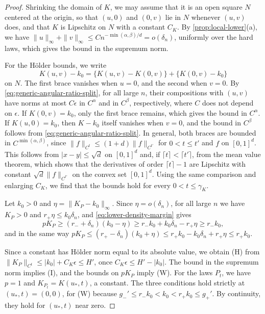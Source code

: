 \begin{proof}
Shrinking the domain of $K$, we may assume that it is an open square $N$
centered at the origin, so that $(u,0)$ and $(0,v)$ lie in $N$ whenever
$(u,v)$ does, and that $K$ is Lipschitz on $N$ with a constant $C_K$.
By \cref{prop:local-lower}(a), we have
$\|u\|_\infty+\|v\|_\infty\le Cn^{-\min(\alpha,\beta)/d}=o(\delta_n)$,
uniformly over the hard laws, which gives the bound in the supremum
norm.

For the H\"older bounds, we write
\[
 K(u,v)-k_0=\{K(u,v)-K(0,v)\}+\{K(0,v)-k_0\}
\]
on $N$. The first brace vanishes when $u=0$, and the second when $v=0$.
By \eqref{eq:generic-angular-ratio-split}, for all large $n$, their
compositions with $(u,v)$ have norms at most $C\epsilon$ in $C^\alpha$
and in $C^\beta$, respectively, where $C$ does not depend on $\epsilon$.
If $K(0,v)=k_0$, only the first brace remains, which gives the bound in
$C^\alpha$. If $K(u,0)=k_0$, then $K-k_0$ itself vanishes when $v=0$,
and the bound in $C^\beta$ follows from
\eqref{eq:generic-angular-ratio-split}.
In general, both braces are bounded in $C^{\min(\alpha,\beta)}$, since
$\|f\|_{C^t}\le(1+d)\|f\|_{C^{t'}}$ for $0<t\le t'$ and $f$ on
$[0,1]^d$. This follows from $|x-y|\le\sqrt d$ on $[0,1]^d$ and, if
$\lceil t\rceil<\lceil t'\rceil$, from the mean value theorem, which
shows that the derivatives of order $\lceil t\rceil-1$ are Lipschitz
with constant $\sqrt d\|f\|_{C^{t'}}$ on the convex set $[0,1]^d$.
Using the same comparison and enlarging $C_K$, we find that the bounds
hold for every $0<t\le\gamma_K$.

Let $k_0>0$ and $\eta=\|K_P-k_0\|_\infty$. Since $\eta=o(\delta_n)$, for
all large $n$ we have $K_P>0$ and $r_+\eta\le k_0\delta_n$, and
\eqref{eq:lower-density-margin} gives
\[
 pK_P\ge(r_-+\delta_n)(k_0-\eta)
 \ge r_-k_0+k_0\delta_n-r_+\eta\ge r_-k_0 ,
\]
and in the same way
$pK_P\le(r_+-\delta_n)(k_0+\eta)\le r_+k_0-k_0\delta_n+r_+\eta\le r_+k_0$.

Since a constant has H\"older norm equal to its absolute value, we
obtain (H) from $\|K_P\|_{C^t}\le|k_0|+C_K\epsilon\le H'$, once
$C_K\epsilon\le H'-|k_0|$. The bound in the supremum norm implies (I),
and the bounds on $pK_P$ imply (W). For the laws $P_t$, we have $p=1$
and $K_{P_t}=K(u_*,t)$, a constant. The three conditions hold strictly
at $(u_*,t)=(0,0)$, for (W) because
$g_-'\le r_-k_0<k_0<r_+k_0\le g_+'$. By continuity, they hold for
$(u_*,t)$ near zero.
\end{proof}

